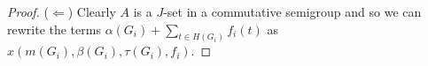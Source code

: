 \documentclass[12pt,showtrims]{memoir}
\theoremstyle{plain}
\theoremstyle{definition}
\begin{document}
\begin{proof}
  ($\Leftarrow$)
  Clearly $A$ is a $J$-set in a commutative semigroup and so we can rewrite the terms $\alpha(G_i) + \sum_{t \in H(G_i)} f_i(t)$ as $x(m(G_i), \beta(G_i), \tau(G_i), f_i)$. 
\end{proof}





\end{document}
